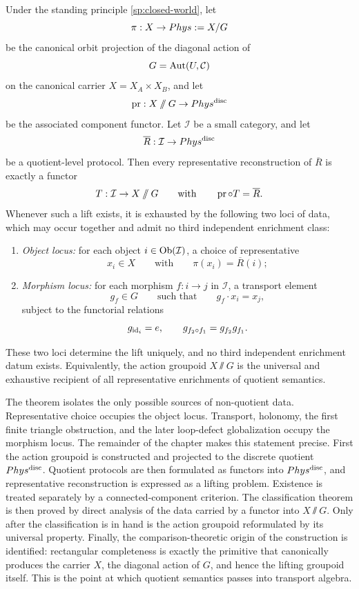 \begin{theorem}
	\label{thm:representative-enrichment-classification}
	Under the standing principle \cref{sp:closed-world}, let
	\[
		\pi:X\to Phys:=X/G
	\]
	be the canonical orbit projection of the diagonal action of
	\[
		G=\operatorname{Aut}(U,\mathcal C)
	\]
	on the canonical carrier \(X=X_A\times X_B\), and let
	\[
		\operatorname{pr}:X\mathbin{/\mkern-6mu/} G\to Phys^{\mathrm{disc}}
	\]
	be the associated component functor.  Let \(\mathcal I\) be a small
	category, and let
	\[
		\overline R:\mathcal I\to Phys^{\mathrm{disc}}
	\]
	be a quotient-level protocol.
	Then every representative reconstruction of \(\overline R\) is exactly
	a functor
	\[
		T:\mathcal I\to X\mathbin{/\mkern-6mu/} G
		\qquad\text{with}\qquad
		\operatorname{pr}\circ T=\overline R.
	\]
		Whenever such a lift exists, it is exhausted by the following two
		loci of data, which may occur together and admit no third
		independent enrichment class:
	\begin{enumerate}[label=\textup{(\roman*)}]
		\item \emph{Object locus:} for each object \(i\in\operatorname{Ob}(\mathcal I)\), a
		      choice of representative
		      \[
			      x_i\in X
			      \qquad\text{with}\qquad
			      \pi(x_i)=\overline R(i);
		      \]
			\item \emph{Morphism locus:} for each morphism \(f:i\to j\) in
			      \(\mathcal I\), a transport element
		      \[
			      g_f\in G
			      \qquad\text{such that}\qquad
			      g_f\cdot x_i=x_j,
		      \]
		      subject to the functorial relations
		      \[
			      g_{\operatorname{id}_i}=e,
			      \qquad
			      g_{f_2\circ f_1}=g_{f_2}g_{f_1}.
		      \]
	\end{enumerate}
	These two loci determine the lift uniquely, and no third independent
	enrichment datum exists.
	Equivalently, the action groupoid \(X\sslash G\) is the universal and
	exhaustive recipient of all representative enrichments of quotient
	semantics.
\end{theorem}
The theorem isolates the only possible sources of non-quotient data.
Representative choice occupies the object locus.  Transport, holonomy,
the first finite triangle obstruction, and the later loop-defect globalization occupy the morphism
locus.  The remainder of the chapter makes this statement precise.
First the action groupoid is constructed and projected to the discrete
quotient \(Phys^{\mathrm{disc}}\).  Quotient protocols are then formulated as
functors into \(Phys^{\mathrm{disc}}\), and representative reconstruction is
expressed as a lifting problem.  Existence is treated separately by a
connected-component criterion.  The classification theorem is then
proved by direct analysis of the data carried by a functor into
\(X\sslash G\).  Only after the classification is in hand is the action
groupoid reformulated by its universal property.  Finally, the
comparison-theoretic origin of the construction is identified:
rectangular completeness is exactly the primitive that canonically
produces the carrier \(X\), the diagonal action of \(G\), and hence the
lifting groupoid itself.
This is the point at which quotient semantics passes into transport
algebra.
